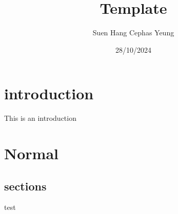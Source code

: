 \documentclass[twoside]{report}
\title{Template}
\author{Suen Hang Cephas Yeung}
\date{28/10/2024}
\begin{document}
\maketitle
\tableofcontents

\chapter*{introduction}
This is an introduction
\chapter{Normal}
\section{sections}
test



\end{document}
